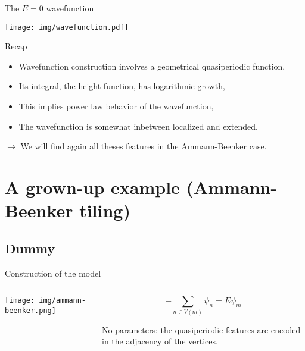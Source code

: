 \documentclass[xcolor=x11names,compress,professionalfonts]{beamer}
\renewcommand{\(}{\begin{columns}}
\renewcommand{\)}{\end{columns}}
\newcommand{\<}[1]{\begin{column}{#1}}
\renewcommand{\>}{\end{column}}
\begin{document}
\begin{frame}{The $E=0$ wavefunction}

{\centering
\texttt{[image: img/wavefunction.pdf]}

}

\end{frame}

\begin{frame}{Recap}

\begin{itemize}
	\item Wavefunction construction involves a geometrical quasiperiodic function,
	\item Its integral, the height function, has logarithmic growth,
	\item This implies power law behavior of the wavefunction,
	\item The wavefunction is somewhat inbetween localized and extended.
\end{itemize}
$\rightarrow$ We will find again all theses features in the Ammann-Beenker case.
\end{frame}

\section{A grown-up example (Ammann-Beenker tiling)}
\subsection{Dummy}
\begin{frame}{Construction of the model}

\begin{columns}

\begin{column}{5cm}
{\centering
\texttt{[image: img/ammann-beenker.png]}

}
\end{column}

\begin{column}{5cm}
\[
	-\sum_{n \in V(m)} \psi_n = E \psi_m
\]

No parameters: the quasiperiodic features are encoded in the adjacency of the vertices.
\end{column}
\end{columns}

\end{frame}
\end{document}

